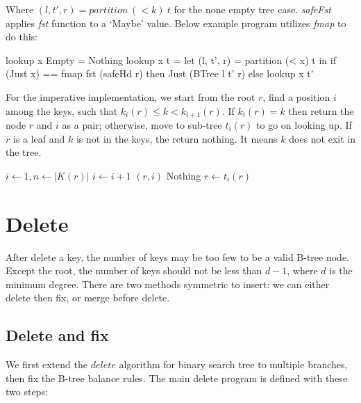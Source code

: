 \documentclass[b5paper]{article}
\begin{document}
Where $(l, t', r) = partition\ (< k)\ t$ for the none empty tree case. \textit{safeFst} applies \textit{fst} function to a `Maybe' value. Below example program utilizes \textit{fmap} to do this:

\begin{Haskell}
lookup x Empty = Nothing
lookup x t = let (l, t', r) = partition (< x) t in
  if (Just x) == fmap fst (safeHd r) then Just (BTree l t' r)
  else lookup x t'
\end{Haskell}

For the imperative implementation, we start from the root $r$, find a position $i$ among the keys, such that $k_i(r) \leq k < k_{i+1}(r)$. If $k_i(r) = k$ then return the node $r$ and $i$ as a pair; otherwise, move to sub-tree $t_i(r)$ to go on looking up. If $r$ is a leaf and $k$ is not in the keys, the return nothing. It means $k$ does not exit in the tree.

\begin{algorithmic}[1]
  \Loop
    \State $i \gets 1, n \gets |K(r)|$
      \State $i \gets i + 1$
    \EndWhile
      \State \Return $(r, i)$
    \EndIf
      \State \Return Nothing 
    \Else
      \State $r \gets t_i(r)$ 
    \EndIf
  \EndLoop
\EndFunction
\end{algorithmic}

\begin{Exercise}
\end{Exercise}

\section{Delete}

After delete a key, the number of keys may be too few to be a valid B-tree node. Except the root, the number of keys should not be less than $d - 1$, where $d$ is the minimum degree. There are two methods symmetric to insert: we can either delete then fix, or merge before delete.

\subsection{Delete and fix}

We first extend the $delete$ algorithm for binary search tree to multiple branches, then fix the B-tree balance rules. The main delete program is defined with these two steps:
\end{document}
